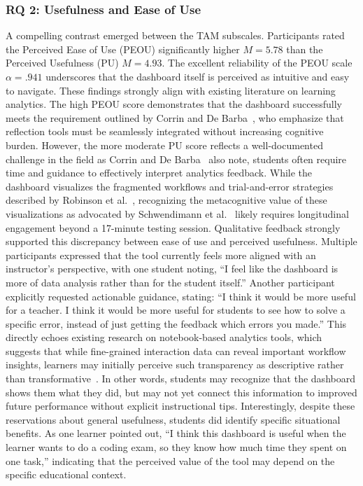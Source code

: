 \subsubsection{RQ 2: Usefulness and Ease of Use}
A compelling contrast emerged between the TAM subscales. Participants rated the Perceived Ease of Use (PEOU) significantly higher $M = 5.78$ than the Perceived Usefulness (PU) $M = 4.93$. The excellent reliability of the PEOU scale $\alpha = .941$ underscores that the dashboard itself is perceived as intuitive and easy to navigate. These findings strongly align with existing literature on learning analytics. The high PEOU score demonstrates that the dashboard successfully meets the requirement outlined by Corrin and De Barba~\cite{corrin2014exploring}, who emphasize that reflection tools must be seamlessly integrated without increasing cognitive burden. However, the more moderate PU score reflects a well-documented challenge in the field as Corrin and De Barba~\cite{corrin2014exploring} also note, students often require time and guidance to effectively interpret analytics feedback. While the dashboard visualizes the fragmented workflows and trial-and-error strategies described by Robinson et al.~\cite{robinson2022error}, recognizing the metacognitive value of these visualizations as advocated by Schwendimann et al.~\cite{schwendimann2016perceiving} likely requires longitudinal engagement beyond a 17-minute testing session. Qualitative feedback strongly supported this discrepancy between ease of use and perceived usefulness. Multiple participants expressed that the tool currently feels more aligned with an instructor's perspective, with one student noting, ``I feel like the dashboard is more of data analysis rather than for the student itself.'' Another participant explicitly requested actionable guidance, stating: ``I think it would be more useful for a teacher. I think it would be more useful for students to see how to solve a specific error, instead of just getting the feedback which errors you made.'' This directly echoes existing research on notebook-based analytics tools, which suggests that while fine-grained interaction data can reveal important workflow insights, learners may initially perceive such transparency as descriptive rather than transformative~\cite{cai2025jupyter,JELAI}. In other words, students may recognize that the dashboard shows them what they did, but may not yet connect this information to improved future performance without explicit instructional tips. Interestingly, despite these reservations about general usefulness, students did identify specific situational benefits. As one learner pointed out, ``I think this dashboard is useful when the learner wants to do a coding exam, so they know how much time they spent on one task,'' indicating that the perceived value of the tool may depend on the specific educational context.

